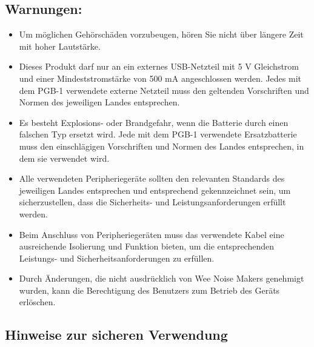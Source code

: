 \documentclass[8pt]{extarticle}
\begin{document}
\begin{multicols*}{3}
\subsection{Warnungen:}
\begin{itemize}
\item Um möglichen Gehörschäden vorzubeugen, hören Sie nicht über längere Zeit mit hoher Lautstärke.
\item Dieses Produkt darf nur an ein externes USB-Netzteil mit 5 V Gleichstrom und einer Mindeststromstärke von 500 mA angeschlossen werden. Jedes mit dem PGB-1 verwendete externe Netzteil muss den geltenden Vorschriften und Normen des jeweiligen Landes entsprechen.
\item Es besteht Explosions- oder Brandgefahr, wenn die Batterie durch einen falschen Typ ersetzt wird. Jede mit dem PGB-1 verwendete Ersatzbatterie muss den einschlägigen Vorschriften und Normen des Landes entsprechen, in dem sie verwendet wird.
\item Alle verwendeten Peripheriegeräte sollten den relevanten Standards des jeweiligen Landes entsprechen und entsprechend gekennzeichnet sein, um sicherzustellen, dass die Sicherheits- und Leistungsanforderungen erfüllt werden.
\item Beim Anschluss von Peripheriegeräten muss das verwendete Kabel eine ausreichende Isolierung und Funktion bieten, um die entsprechenden Leistungs- und Sicherheitsanforderungen zu erfüllen.
\item Durch Änderungen, die nicht ausdrücklich von Wee Noise Makers genehmigt wurden, kann die Berechtigung des Benutzers zum Betrieb des Geräts erlöschen.
\end{itemize}

\subsection{Hinweise zur sicheren Verwendung}


\end{multicols*}
\end{document}
